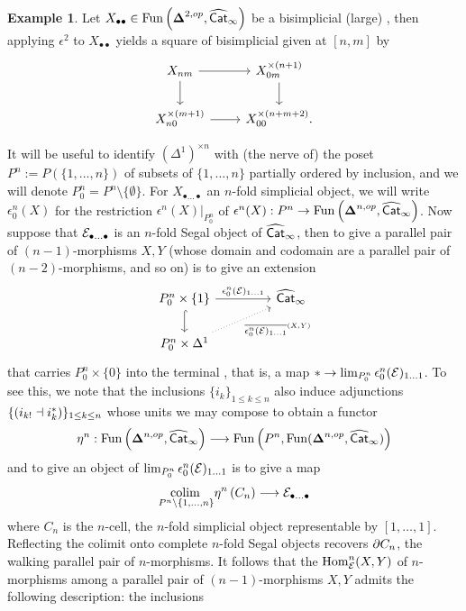 \documentclass[10pt, reqno, twoside
, final
]{amsart}
\numberwithin{equation}{subsection}%
\theoremstyle{definition}
\theoremstyle{definition}
\theoremstyle{definition}
\theoremstyle{definition}
\theoremstyle{definition}
\theoremstyle{definition}
\theoremstyle{definition}
\theoremstyle{definition}
\theoremstyle{definition}
\theoremstyle{plain}
\theoremstyle{definition}
\theoremstyle{plain}
\theoremstyle{definition}
\theoremstyle{plain}
\theoremstyle{definition}
\theoremstyle{definition}
\theoremstyle{plain}
\theoremstyle{plain}
\theoremstyle{definition}
\newtheorem{ex}[defn]{Example}
\theoremstyle{plain}
\theoremstyle{plain}
\theoremstyle{plain}
\begin{document}
\begin{ex}
Let $X_{\bullet\bullet}\in \mathrm{Fun}\left(\boldsymbol{\Delta}^{2,op},\widehat{\mathsf{Cat}}_{\infty}\right)$ be a bisimplicial (large) \infcatt, then applying $\epsilon^2$ to $X_{\bullet\bullet}$ yields a square of bisimplicial \infcats given at $[n,m]$ by 
\[
\begin{tikzcd}
X_{nm} \ar[d] \ar[r] & X_{0m}^{\times (n+1)} \ar[d] \\
X_{n0}^{\times (m+1)} \ar[r] & X_{00}^{\times (n+m+2)}.    
\end{tikzcd}
\]    
\end{ex}
It will be useful to identify $(\Delta^1)^{\times n}$ with (the nerve of) the poset $P^n:=P(\{1,\ldots,n\})$ of subsets of $\{1,\ldots,n\}$ partially ordered by inclusion, and we will denote $P^n_0= P^n \setminus \{\emptyset\}$. For $X_{\bullet\ldots\bullet}$ an $n$-fold simplicial object, we will write $\epsilon^n_0(X)$ for the restriction $\epsilon^n(X)|_{P_0^n}$ of $\epsilon^n(X):P^n\rightarrow \mathrm{Fun}\left(\boldsymbol{\Delta}^{n,op},\widehat{\mathsf{Cat}}_{\infty} \right)$. Now suppose that $\mathcal{E}_{\bullet\ldots\bullet}$ is an $n$-fold Segal object of $\widehat{\mathsf{Cat}}_{\infty}$, then to give a parallel pair of $(n-1)$-morphisms $X,Y$ (whose domain and codomain are a parallel pair of $(n-2)$-morphisms, and so on) is to give an extension
\begin{equation}\label{eq:extension}
\begin{tikzcd}
P_0^n \times \{1\} \ar[r,"\epsilon_0^n(\icate)_{1\ldots 1}"] \ar[d,hook] &[2em] \catinfh\\
P_{0}^n \times\Delta^1 \ar[ur,"\overline{\epsilon_0^n(\icate)_{1\ldots 1}}^{(X,Y)}"',dotted]
\end{tikzcd}
\end{equation}
that carries $P_0^n\times \{0\}$ into the terminal \infcatt, that is, a map $*\rightarrow \lim_{P^n_0}\epsilon_0^n(\mathcal{E})_{1\ldots 1}$. To see this, we note that the inclusions $\{i_k\}_{1\leq k\leq n}$ also induce adjunctions $\{(i_{k!}\dashv i_k^*)\}_{1\leq k\leq n}$ whose units we may compose to obtain a functor
\[ \eta^n:\mathrm{Fun}\left(\boldsymbol{\Delta}^{n,op},\widehat{\mathsf{Cat}}_{\infty}\right)\longrightarrow \mathrm{Fun}\left(P^n, \mathrm{Fun}(\boldsymbol{\Delta}^{n,op},\widehat{\mathsf{Cat}}_{\infty})\right)  \]
and to give an object of $\lim_{P^n_0}\epsilon_0^n(\mathcal{E})_{1\ldots 1}$ is to give a map
\[  \underset{P^n\setminus \{1,\ldots,n\}}{\mathrm{colim}\,} \eta^n\left(C_n\right) \longrightarrow \mathcal{E}_{\bullet \ldots\bullet} \]
where $C_n$ is the $n$-cell, the $n$-fold simplicial object representable by $[1,\ldots,1]$. Reflecting the colimit onto complete $n$-fold Segal objects recovers $\partial C_n$, the walking parallel pair of $n$-morphisms. It follows that the \infcat $\mathrm{Hom}^n_{\mathcal{E}}(X,Y)$ of $n$-morphisms among a parallel pair of $(n-1)$-morphisms $X,Y$ admits the following description: the inclusions
\end{document}
